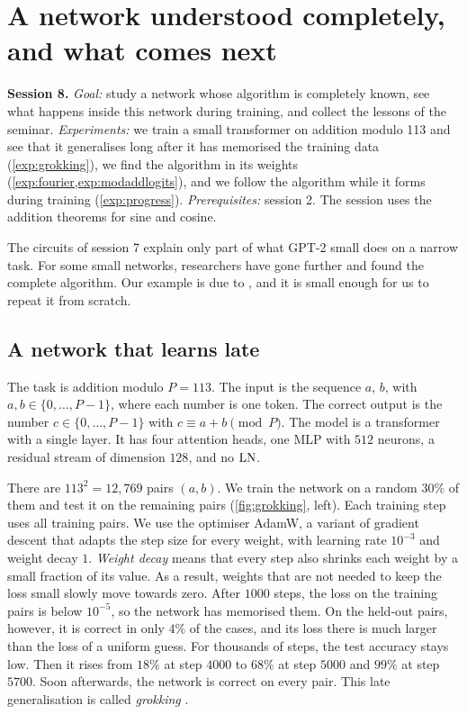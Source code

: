 \section{A network understood completely, and what comes next}
\label{sec:modadd}

\begin{sessioncard}
\textbf{Session 8.} \emph{Goal:} study a network whose algorithm is completely known, see what happens inside
this network during training, and collect the lessons of the seminar.
\emph{Experiments:} we train a small transformer on addition modulo 113 and see that it generalises long after it
has memorised the training data (\cref{exp:grokking}), we find the algorithm in its weights
(\cref{exp:fourier,exp:modaddlogits}), and we follow the algorithm while it forms during training
(\cref{exp:progress}).
\emph{Prerequisites:} session 2. The session uses the addition theorems for sine and cosine.
\end{sessioncard}

The circuits of session 7 explain only part of what GPT-2 small does on a narrow task. For some small networks,
researchers have gone further and found the complete algorithm. Our example is due to \citet{nanda2023progress},
and it is small enough for us to repeat it from scratch.

\subsection{A network that learns late}

The task is addition modulo $P=113$. The input is the sequence $a$, $b$, \tok{=} with $a,b\in\{0,\dots,P-1\}$,
where each number is one token. The correct output is the number $c\in\{0,\dots,P-1\}$ with
$c\equiv a+b \pmod P$. The model is a transformer with a single layer. It has four attention heads, one MLP with
$512$ neurons, a residual stream of dimension $128$, and no $\mathrm{LN}$.

\begin{experiment}\label{exp:grokking} 
There are $113^2=12{,}769$ pairs $(a,b)$. We train the network on a random $30\%$ of them and test it on the
remaining pairs (\cref{fig:grokking}, left). Each training step uses all training pairs. We use the optimiser
AdamW, a variant of gradient descent that adapts the step size for every weight, with learning rate $10^{-3}$ and
weight decay $1$. \emph{Weight decay} means that every step also shrinks each weight by a small fraction of its
value. As a result, weights that are not needed to keep the loss small slowly move towards zero. After $1000$
steps, the loss on the training pairs is below $10^{-5}$, so the network has memorised them. On the held-out
pairs, however, it is correct in only $4\%$ of the cases, and its loss there is much larger than the loss of a
uniform guess. For thousands of steps, the test accuracy stays low. Then it rises from $18\%$ at step $4000$ to
$68\%$ at step $5000$ and $99\%$ at step $5700$. Soon afterwards, the network is correct on every pair. This late
generalisation is called \emph{grokking} \citep{power2022grokking}.
\end{experiment}

